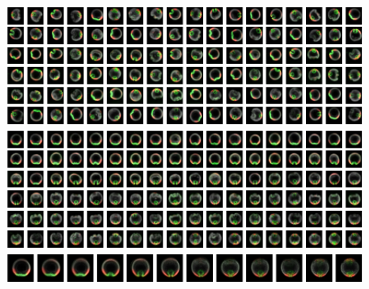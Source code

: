 \documentclass[12pt]{minimal}
\begin{document}
\centering
{}
\includegraphics[width=17cm]{raw_data2}\\
\vspace{0.2cm}
\includegraphics[width=17cm]{VDM_ordered}\\
\vspace{0.2cm}
\includegraphics[width=17cm]{average_trajectory}
\end{document}
